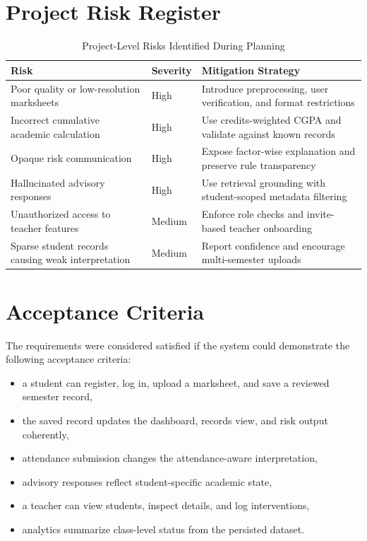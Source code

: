 \section{Project Risk Register}
\begin{table}[H]
\centering
\caption{Project-Level Risks Identified During Planning}
\begin{tabularx}{\textwidth}{>{\raggedright\arraybackslash}p{} >{\raggedright\arraybackslash}p{} >{\raggedright\arraybackslash}X}
\toprule
\textbf{Risk} & \textbf{Severity} & \textbf{Mitigation Strategy} \\
\midrule
Poor quality or low-resolution marksheets & High & Introduce preprocessing, user verification, and format restrictions \\
Incorrect cumulative academic calculation & High & Use credits-weighted CGPA and validate against known records \\
Opaque risk communication & High & Expose factor-wise explanation and preserve rule transparency \\
Hallucinated advisory responses & High & Use retrieval grounding with student-scoped metadata filtering \\
Unauthorized access to teacher features & Medium & Enforce role checks and invite-based teacher onboarding \\
Sparse student records causing weak interpretation & Medium & Report confidence and encourage multi-semester uploads \\
\bottomrule
\end{tabularx}
\end{table}

\section{Acceptance Criteria}
The requirements were considered satisfied if the system could demonstrate the following acceptance criteria:
\begin{itemize}[leftmargin=*]
\item a student can register, log in, upload a marksheet, and save a reviewed semester record,
\item the saved record updates the dashboard, records view, and risk output coherently,
\item attendance submission changes the attendance-aware interpretation,
\item advisory responses reflect student-specific academic state,
\item a teacher can view students, inspect details, and log interventions,
\item analytics summarize class-level status from the persisted dataset.
\end{itemize}

